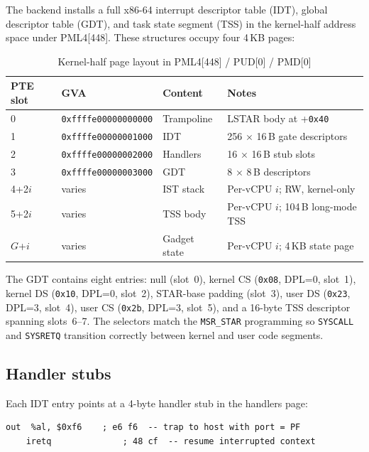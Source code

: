 The backend installs a full x86-64 interrupt descriptor table (IDT), global
descriptor table (GDT), and task state segment (TSS) in the kernel-half
address space under PML4[448].  These structures occupy four 4\,KB pages:

\begin{table}[ht]
\centering
\caption{Kernel-half page layout in PML4[448] / PUD[0] / PMD[0]}
\label{tab:kernel-half-layout}
\begin{tabular}{lllp{6cm}}
\toprule
\textbf{PTE slot} & \textbf{GVA} & \textbf{Content} & \textbf{Notes} \\
\midrule
0 & \texttt{0xffffe00000000000} & Trampoline & LSTAR body at +\texttt{0x40} \\
1 & \texttt{0xffffe00000001000} & IDT        & 256 $\times$ 16\,B gate descriptors \\
2 & \texttt{0xffffe00000002000} & Handlers   & 16 $\times$ 16\,B stub slots \\
3 & \texttt{0xffffe00000003000} & GDT        & 8 $\times$ 8\,B descriptors \\
4+2$i$ & varies & IST stack  & Per-vCPU $i$; RW, kernel-only \\
5+2$i$ & varies & TSS body   & Per-vCPU $i$; 104\,B long-mode TSS \\
$G$+$i$ & varies & Gadget state & Per-vCPU $i$; 4\,KB state page \\
\bottomrule
\end{tabular}
\end{table}

\noindent
The GDT contains eight entries: null (slot~0), kernel CS (\texttt{0x08},
DPL=0, slot~1), kernel DS (\texttt{0x10}, DPL=0, slot~2), STAR-base
padding (slot~3), user DS (\texttt{0x23}, DPL=3, slot~4), user CS
(\texttt{0x2b}, DPL=3, slot~5), and a 16-byte TSS descriptor spanning
slots~6--7.  The selectors match the \texttt{MSR\_STAR} programming
so \texttt{SYSCALL} and \texttt{SYSRETQ} transition correctly between
kernel and user code segments.

\subsection{Handler stubs}

Each IDT entry points at a 4-byte handler stub in the handlers page:

\begin{lstlisting}[language={[x86masm]Assembler},
    caption={Exception handler stub (e.g., \#PF at port 0xf6)},
    label={lst:exception-stub}]
    out  %al, $0xf6    ; e6 f6  -- trap to host with port = PF
    iretq              ; 48 cf  -- resume interrupted context
\end{lstlisting}

